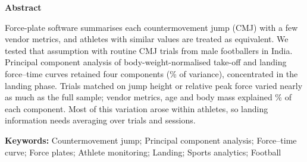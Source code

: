 \noindent\textbf{Abstract}\par\smallskip
\noindent Force-plate software summarises each countermovement jump (CMJ) with a few vendor metrics, and athletes with similar values are treated as equivalent. We tested that assumption with \nTrials{} routine CMJ trials from \nAth{} male footballers in India. Principal component analysis of body-weight-normalised take-off and landing force--time curves retained four components (\cumFour\% of variance), concentrated in the landing phase. Trials matched on jump height or relative peak force varied nearly as much as the full sample; vendor metrics, age and body mass explained \rtwoRange\% of each component. Most of this variation arose within athletes, so landing information needs averaging over trials and sessions.

\medskip
\noindent\textbf{Keywords:} Countermovement jump; Principal component analysis; Force--time curve; Force plates; Athlete monitoring; Landing; Sports analytics; Football
